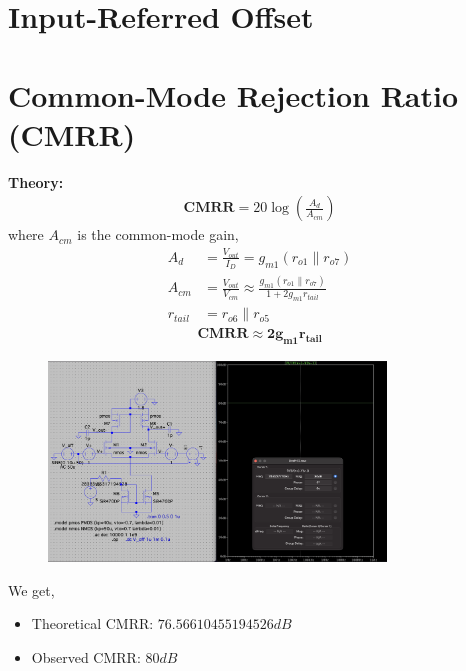 \documentclass[12pt,a4paper]{article}
\newcommand{\brak}[1]{\ensuremath{\left(#1\right)}}
\providecommand{\brak}[1]{\ensuremath{\left(#1\right)}}
\begin{document}
\section{Input-Referred Offset}

\section{Common-Mode Rejection Ratio (CMRR)}
\textbf{Theory:}
\begin{align*}
\textbf{CMRR} = 20 \log{\brak{\frac{A_{d}}{A_{cm}}} }
\end{align*}
where $A_{cm}$ is the common-mode gain,
\begin{align*}
    A_d &= \frac{V_{out}}{I_D} = g_{m1}(r_{o1}\parallel r_{o7}) \\
    A_{cm} &= \frac{V_{out}}{V_{cm}} \approx \frac{g_{m1}(r_{o1}\parallel r_{o7})}{1+2g_{m1}r_{tail}} \\
    r_{tail} &= r_{o6}\parallel r_{o5}
\end{align*}
\begin{align*}
    \mathbf{CMRR \approx 2g_{m1}r_{tail}}
\end{align*}
\vspace{6pt}
\begin{figure}[H]
    \centering
    \includegraphics[width=0.8\textwidth]{figs/CMRR.png}
\end{figure}
We get,
\begin{itemize}
    \item Theoretical CMRR: $76.56610455194526 dB$
    \item Observed CMRR: $80 dB$
\end{itemize}

\vspace{10pt}
\end{document}
